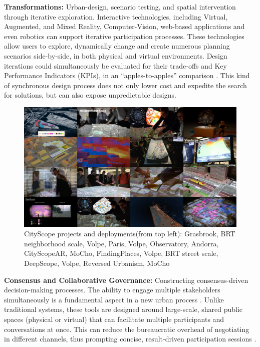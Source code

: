 {\textbf{Transformations:} Urban-design, scenario testing, and spatial intervention through iterative exploration. Interactive technologies, including Virtual, Augmented, and Mixed Reality, Computer-Vision, web-based applications and even robotics can support iterative participation processes. These technologies allow users to explore, dynamically change and create numerous planning scenarios side-by-side, in both physical and virtual environments. Design iterations could simultaneously be evaluated for their trade-offs and Key Performance Indicators (KPIs), in an ``apples-to-apples'' comparison \cite{Ishii2002}. This kind of synchronous design process does not only lower cost and expedite the search for solutions, but can also expose unpredictable designs.}



\begin{figure}[t]
\begin{center}
   \includegraphics[width=0.9\linewidth]{figures/all_projects.png}
\end{center}
   \caption{CityScope projects and deployments(from top left): Grasbrook, BRT neighborhood scale, Volpe, Paris, Volpe, Observatory, Andorra, CityScopeAR, MoCho, FindingPlaces, Volpe, BRT street scale, DeepScope, Volpe, Reversed Urbanism, MoCho}
\label{fig:all_projects}
\end{figure}
 

{\textbf{Consensus and Collaborative Governance:} Constructing consensus-driven decision-making processes. The ability to engage multiple stakeholders simultaneously is a fundamental aspect in a new urban process \cite{Ben-Joseph2004}. Unlike traditional systems, these tools are designed around large-scale, shared public spaces (physical or virtual) that can facilitate multiple participants and conversations at once. This can reduce the bureaucratic overhead of negotiating in different channels, thus prompting concise, result-driven participation sessions \cite{Ben-Joseph2001, Innes2016}.}



